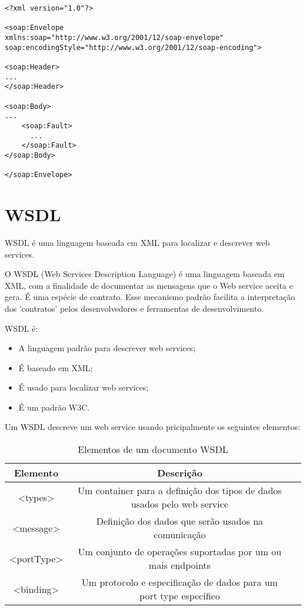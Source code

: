 \lstset{language=XML}
\begin{lstlisting}[title={` Estrutura de uma mensagem SOAP'}]
<?xml version="1.0"?>

<soap:Envelope
xmlns:soap="http://www.w3.org/2001/12/soap-envelope"
soap:encodingStyle="http://www.w3.org/2001/12/soap-encoding">

<soap:Header>
...
</soap:Header>

<soap:Body>
...  
	<soap:Fault>
	  ...  
	</soap:Fault>
</soap:Body>

</soap:Envelope>
\end{lstlisting}

\section{WSDL}

WSDL é uma linguagem baseada em XML para localizar e descrever web services.

O WSDL (Web Services Description Language) é uma linguagem baseada em XML, com a finalidade de documentar as mensagens que o Web service aceita e gera. É uma espécie de contrato. Esse mecanismo padrão facilita a interpretação dos 'contratos' pelos desenvolvedores e ferramentas de desenvolvimento. 

WSDL é:

\begin {itemize}
	\item A linguagem padrão para descrever web services;
	\item É baseado em XML;
	\item É usado para localizar web services;
	\item É um padrão W3C.
\end {itemize}

Um WSDL descreve um web service usando pricipalmente os seguintes elementos:

\begin{table}[h]
	\caption{Elementos de um documento WSDL}
	\begin{center}
	\begin{tabular}{ccc}
		\hline
			\textbf{Elemento} & \textbf{Descrição} \\
		\hline
			<types> & Um container para a definição dos tipos de dados usados pelo web service\\
			<message> & Definição dos dados que serão usados na comunicação \\
			<portType> & Um conjunto de operações suportadas por um ou mais endpoints \\
			<binding> & Um protocolo e especificação de dados para um port type específico\\
		\hline
	\end {tabular}
	\end{center}
	\label{tab:elementosWsdl}
\end{table}

